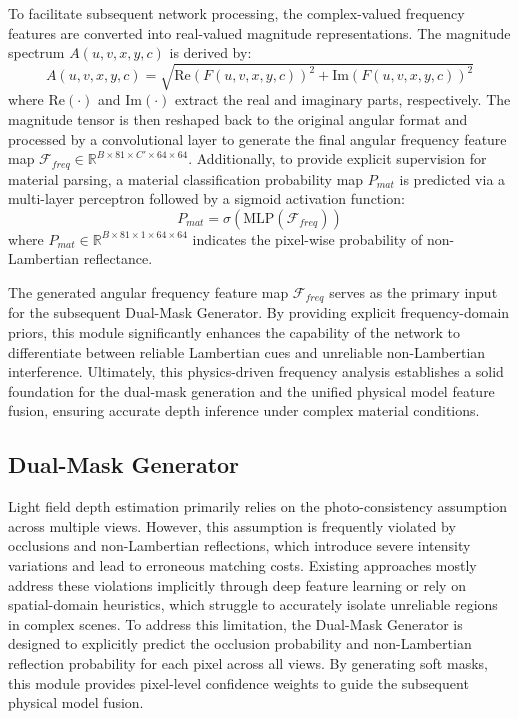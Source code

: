 \documentclass[lettersize,journal]{IEEEtran}
\begin{document}
To facilitate subsequent network processing, the complex-valued frequency features are converted into real-valued magnitude representations. The magnitude spectrum $A(u,v,x,y,c)$ is derived by:
\begin{equation}
\label{eq:eq4}
A(u,v,x,y,c) = \sqrt{\text{Re}(F(u,v,x,y,c))^2 + \text{Im}(F(u,v,x,y,c))^2}
\end{equation}
where $\text{Re}(\cdot)$ and $\text{Im}(\cdot)$ extract the real and imaginary parts, respectively. The magnitude tensor is then reshaped back to the original angular format and processed by a convolutional layer to generate the final angular frequency feature map $\mathcal{F}_{freq} \in \mathbb{R}^{B \times 81 \times C' \times 64 \times 64}$. Additionally, to provide explicit supervision for material parsing, a material classification probability map $P_{mat}$ is predicted via a multi-layer perceptron followed by a sigmoid activation function:
\begin{equation}
\label{eq:eq5}
P_{mat} = \sigma(\text{MLP}(\mathcal{F}_{freq}))
\end{equation}
where $P_{mat} \in \mathbb{R}^{B \times 81 \times 1 \times 64 \times 64}$ indicates the pixel-wise probability of non-Lambertian reflectance.

The generated angular frequency feature map $\mathcal{F}_{freq}$ serves as the primary input for the subsequent Dual-Mask Generator. By providing explicit frequency-domain priors, this module significantly enhances the capability of the network to differentiate between reliable Lambertian cues and unreliable non-Lambertian interference. Ultimately, this physics-driven frequency analysis establishes a solid foundation for the dual-mask generation and the unified physical model feature fusion, ensuring accurate depth inference under complex material conditions.

\subsection{Dual-Mask Generator}

Light field depth estimation primarily relies on the photo-consistency assumption across multiple views. However, this assumption is frequently violated by occlusions and non-Lambertian reflections, which introduce severe intensity variations and lead to erroneous matching costs. Existing approaches mostly address these violations implicitly through deep feature learning or rely on spatial-domain heuristics, which struggle to accurately isolate unreliable regions in complex scenes. To address this limitation, the Dual-Mask Generator is designed to explicitly predict the occlusion probability and non-Lambertian reflection probability for each pixel across all views. By generating soft masks, this module provides pixel-level confidence weights to guide the subsequent physical model fusion.
\end{document}
